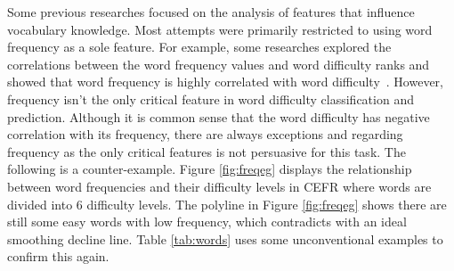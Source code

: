 Some previous researches focused on the analysis of features that influence vocabulary knowledge.
Most attempts were primarily restricted to using word frequency as a sole feature.
For example, some researches explored the correlations between the 
word frequency values and word difficulty ranks and showed that 
word frequency is highly correlated with word difficulty~\cite{breland1996word,ryder1988relationship,chang2018learning}.
However, frequency isn't the only critical feature in 
word difficulty classification and prediction.  
Although it is common sense that the word difficulty 
has negative correlation with its frequency, there are always 
exceptions and regarding frequency as the only critical features 
is not persuasive for this task. The following is a counter-example.
Figure \ref{fig:freqeg}
displays the relationship between word frequencies and their difficulty levels in CEFR where words are divided into 6 difficulty levels.
The polyline in Figure \ref{fig:freqeg} shows there are still some 
easy words with low frequency, which contradicts with an ideal 
smoothing decline line.
Table \ref{tab:words} uses some unconventional examples to confirm this again.

